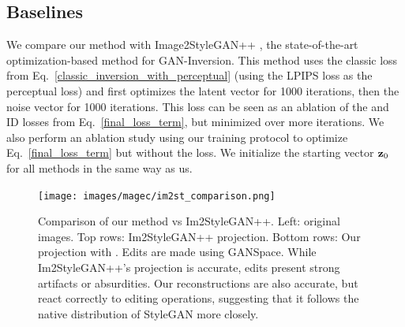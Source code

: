 \subsection{Baselines}
We compare our method with Image2StyleGAN++ \citep{abdal2020}, the state-of-the-art
 optimization-based method for GAN-Inversion. This method uses the classic loss from
  Eq.~\ref{classic_inversion_with_perceptual} (using the LPIPS \citep{zhanglpips2018} loss 
  as the perceptual loss) and first optimizes the latent vector for 1000 iterations, then
   the noise vector for 1000 iterations. This loss can be seen as an ablation of the \magec 
   and ID losses from Eq.~\ref{final_loss_term}, but minimized over more iterations. We
    also perform an ablation study using our training protocol to optimize 
    Eq.~\ref{final_loss_term} but without the \magec loss. We initialize the starting 
    vector $\mathbf{z}_0$ for all methods 
    in the same way as us.


\begin{figure}
  \centering
    \texttt{[image: images/magec/im2st\_comparison.png]}
    \caption{Comparison of our method vs Im2StyleGAN++. Left: original images. Top rows: 
    Im2StyleGAN++ projection. Bottom rows: Our projection with \magec. Edits are made 
    using GANSpace. While Im2StyleGAN++'s projection is accurate, edits present strong 
    artifacts or absurdities. Our reconstructions are also accurate, but react correctly 
    to editing operations, suggesting that it follows the native distribution of StyleGAN
     more closely.}
    \label{fig:im2stcomparison}
\end{figure}


